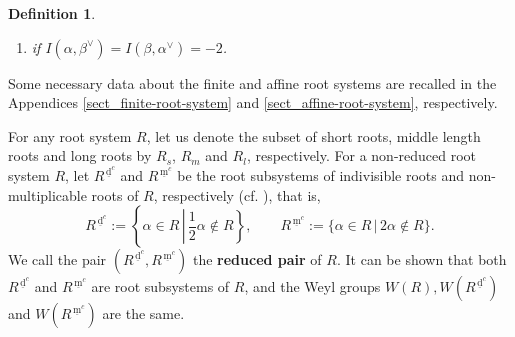 \documentclass[11pt]{amsart}
\newcommand{\dc}{\,\underline{\mathrm{d}}^c}
\newcommand{\mc}{\, \underline{\mathrm{m}}^c}
\newtheorem{defn}{Definition}[section]
\begin{document}
\begin{defn}
\begin{enumerate}
\begin{tikzpicture}
           \end{tikzpicture} 
if $I(\alpha, \beta^\vee)=-1$ and $I(\beta, \alpha^\vee)=-t$ for $t=2,3,4$ and
\item[(Edge3)]    
if $I(\alpha, \beta^\vee)=I(\beta, \alpha^\vee)=-2$.
\end{enumerate}
\end{defn}
Some necessary data about the finite and affine root systems are recalled in
the Appendices \ref{sect_finite-root-system} and \ref{sect_affine-root-system}, respectively. 

For any root system $R$, let us denote the subset of short roots, middle length roots 
and long roots by $R_s$, 
$R_m$ and 
$R_l$, respectively. 
For a non-reduced root system $R$, let $R^{\dc}$\index[notations]{r114@$R^{\dc}$} and 
$R^{\mc}$\index[notations]{r115@$R^{\mc}$} be the root subsystems of indivisible roots 
and non-multiplicable roots of $R$, respectively (cf. \cite{Macdonald1972}), that is,
\[
R^{\dc}:=
\left\{ \alpha \in R\, \left\vert \, \frac{1}{2}\alpha \not\in R\right\}, \right. \qquad
R^{\mc}:=
\{ \alpha \in R\, \vert\, 2\alpha \not\in R\}.
\]
We call the pair $(R^{\dc}, R^{\mc})$ 
the \textbf{reduced pair} of $R$. 
It can be shown that both $R^{\dc}$ and $R^{\mc}$ are root subsystems of $R$, and the 
Weyl groups $W(R), W(R^{\dc})$ and $W(R^{\mc})$ are the same. 
\medskip
\end{document}
